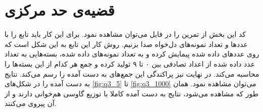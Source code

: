 \documentclass[11pt, a4paper]{article}
\begin{document}
\section{\textbf{قضیه‌ی حد مرکزی}}
کد این بخش از تمرین را در فایل
می‌توان مشاهده نمود.
برای این کار باید تابع
را با عدد‌ها و تعداد نمونه‌های دل‌خواه صدا بزنیم.
روش کار این تابع به این شکل است که 
روی عدد‌های داده شده پیمایش کرده و به تعداد نمونه‌های داده شده، بسته‌هایی به تعداد عدد داده شده از اعداد تصادفی
بین ۰ تا ۹ تولید کرده و جمع هر کدام از این بسته‌ها را محاسبه می‌کند.
در نهایت نیز پراکندگی این جمع‌های به دست آمده را رسم می‌کند.
نتایج به دست آمده را در شکل‌های
\ref{fig:q3_5}
تا
\ref{fig:q3_1000}
می‌توان مشاهده نمود.
همان طور که مشاهده می‌شود، نتایج به دست آمده کاملا با توزیع گاوسی هم‌خوانی دارند و از آن پیروی می‌کنند.
\end{document}
